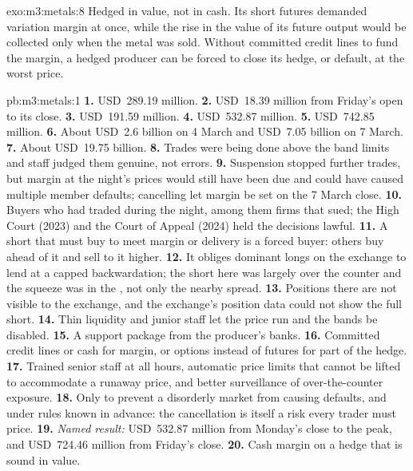 \begin{solution}{exo:m3:metals:8}
Hedged in value, not in cash. Its short futures demanded variation margin at once, while the rise in
the value of its future output would be collected only when the metal was sold. Without committed
credit lines to fund the margin, a hedged producer can be forced to close its hedge, or default, at
the worst price.
\end{solution}

\begin{solution}{pb:m3:metals:1}
\textbf{1.} USD~289.19 million. \textbf{2.} USD~18.39 million from Friday's open to its close.
\textbf{3.} USD~191.59 million. \textbf{4.} USD~532.87 million. \textbf{5.} USD~742.85 million.
\textbf{6.} About USD~2.6 billion on 4 March and USD~7.05 billion on 7 March. \textbf{7.} About
USD~19.75 billion. \textbf{8.} Trades were being done above the band limits and staff judged them
genuine, not errors. \textbf{9.} Suspension stopped further trades, but margin at the night's prices
would still have been due and could have caused multiple member defaults; cancelling let margin be
set on the 7 March close. \textbf{10.} Buyers who had traded during the night, among them firms that
sued; the High Court (2023) and the Court of Appeal (2024) held the decisions lawful.
\textbf{11.} A short that must buy to meet margin or delivery is a forced buyer: others buy ahead of it
and sell to it higher. \textbf{12.} It obliges dominant longs on the exchange to lend at a capped
backwardation; the short here was largely over the counter and the squeeze was in the , not only the nearby spread. \textbf{13.} Positions there are not visible to the exchange, and
the exchange's position data could not show the full short. \textbf{14.} Thin liquidity and junior
staff let the price run and the bands be disabled. \textbf{15.} A support package from the producer's
banks. \textbf{16.} Committed credit lines or cash for margin, or options instead of futures for part
of the hedge. \textbf{17.} Trained senior staff at all hours, automatic price limits that cannot be
lifted to accommodate a runaway price, and better surveillance of over-the-counter exposure.
\textbf{18.} Only to prevent a disorderly market from causing defaults, and under rules known in
advance: the cancellation is itself a risk every trader must price. \textbf{19.} \emph{Named result:}
USD~532.87 million from Monday's close to the peak, and USD~724.46 million from Friday's close.
\textbf{20.} Cash margin on a hedge that is sound in value.
\end{solution}


